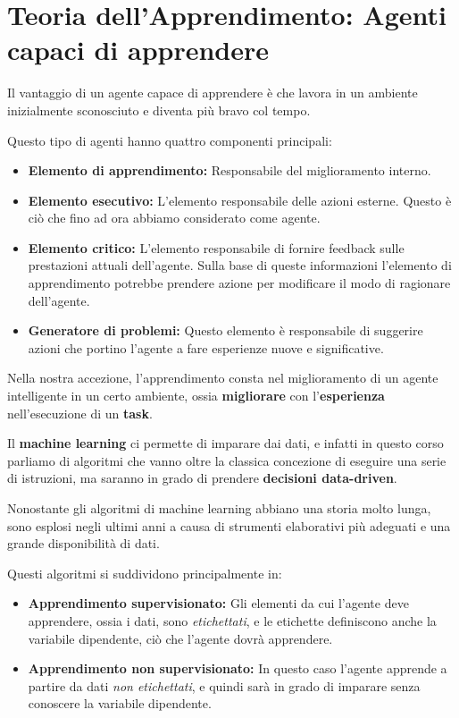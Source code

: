 \section{Teoria dell'Apprendimento: Agenti capaci di apprendere}
    Il vantaggio di un agente capace di apprendere è che lavora in un ambiente inizialmente sconosciuto e diventa più bravo col tempo.
    
    Questo tipo di agenti hanno quattro componenti principali:
    \begin{itemize}
        \item \textbf{Elemento di apprendimento:} Responsabile del miglioramento interno.
        
        \item \textbf{Elemento esecutivo:} L'elemento responsabile delle azioni esterne. Questo è ciò che fino ad ora abbiamo considerato come agente.
        
        \item \textbf{Elemento critico:} L'elemento responsabile di fornire feedback sulle prestazioni attuali dell'agente. Sulla base di queste informazioni l'elemento di apprendimento potrebbe prendere azione per modificare il modo di ragionare dell'agente.
        
        \item \textbf{Generatore di problemi:} Questo elemento è responsabile di suggerire azioni che portino l'agente a fare esperienze nuove e significative.
    \end{itemize}
    
    Nella nostra accezione, l'apprendimento consta nel miglioramento di un agente intelligente in un certo ambiente, ossia \textbf{migliorare} con l'\textbf{esperienza} nell'esecuzione di un \textbf{task}.
    
    Il \textbf{machine learning} ci permette di imparare dai dati, e infatti in questo corso parliamo di algoritmi che vanno oltre la classica concezione di eseguire una serie di istruzioni, ma saranno in grado di prendere \textbf{decisioni data-driven}.
    
    Nonostante gli algoritmi di machine learning abbiano una storia molto lunga, sono esplosi negli ultimi anni a causa di strumenti elaborativi più adeguati e una grande disponibilità di dati.
    
    Questi algoritmi si suddividono principalmente in:
    \begin{itemize}
        \item \textbf{Apprendimento supervisionato:} Gli elementi da cui l'agente deve apprendere, ossia i dati, sono \textit{etichettati}, e le etichette definiscono anche la variabile dipendente, ciò che l'agente dovrà apprendere.
        
        \item \textbf{Apprendimento non supervisionato:} In questo caso l'agente apprende a partire da dati \textit{non etichettati}, e quindi sarà in grado di imparare senza conoscere la variabile dipendente.
    \end{itemize}
    
